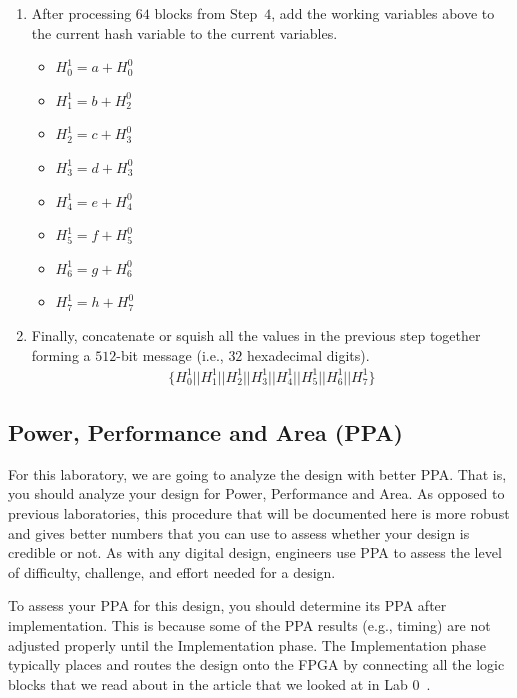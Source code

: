 \documentclass{article}
\begin{document}
\begin{enumerate}
  \item After processing $64$ blocks from Step~$4$, add the working
    variables above to the current hash variable    
    to the current variables.
    \begin{itemize}
    \item $H_0^1 = a + H_0^0$
    \item $H_1^1 = b + H_2^0$
    \item $H_2^1 = c + H_3^0$
    \item $H_3^1 = d + H_3^0$
    \item $H_4^1 = e + H_4^0$
    \item $H_5^1 = f + H_5^0$
    \item $H_6^1 = g + H_6^0$
    \item $H_7^1 = h + H_7^0$
    \end{itemize}

  \item Finally, concatenate or squish all the values in the
    previous step together forming a $512$-bit message (i.e., $32$
    hexadecimal digits).
    \begin{eqnarray*}
      \{H_0^1 || H_1^1 || H_2^1 || H_3^1 || H_4^1 || H_5^1 || H_6^1 || H_7^1\}
    \end{eqnarray*}
    
\end{enumerate}


\subsection{Power, Performance and Area (PPA)}

For this laboratory, we are going to analyze the design with better
PPA.  That is, you should analyze your design for Power, Performance
and Area.  As opposed to previous laboratories, this procedure that
will be documented here is more robust and gives better numbers that
you can use to assess whether your design is credible or not.  As with
any digital design, engineers use PPA to assess the level of
difficulty, challenge, and effort needed for a design.

To assess your PPA for this design, you should determine its PPA after
implementation.  This is because some of the PPA results (e.g.,
timing) are not adjusted properly until the Implementation phase.  The
Implementation phase typically places and routes the design onto the
FPGA by connecting all the logic blocks that we read about in the
article that we looked at in Lab 0~\cite{7086413}.
\end{document}
